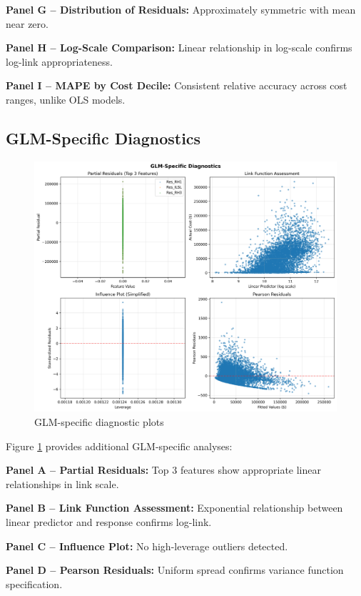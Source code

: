 \textbf{Panel G -- Distribution of Residuals:}
Approximately symmetric with mean near zero.

\textbf{Panel H -- Log-Scale Comparison:}
Linear relationship in log-scale confirms log-link appropriateness.

\textbf{Panel I -- MAPE by Cost Decile:}
Consistent relative accuracy across cost ranges, unlike OLS models.

\subsection{GLM-Specific Diagnostics}

\begin{figure}[h!]
\centering
\includegraphics[width=\textwidth]{models/model_2/glm_specific_plots.png}
\caption{GLM-specific diagnostic plots}
\label{fig:model2_glm}
\end{figure}

Figure \ref{fig:model2_glm} provides additional GLM-specific analyses:

\textbf{Panel A -- Partial Residuals:}
Top 3 features show appropriate linear relationships in link scale.

\textbf{Panel B -- Link Function Assessment:}
Exponential relationship between linear predictor and response confirms log-link.

\textbf{Panel C -- Influence Plot:}
No high-leverage outliers detected.

\textbf{Panel D -- Pearson Residuals:}
Uniform spread confirms variance function specification.


